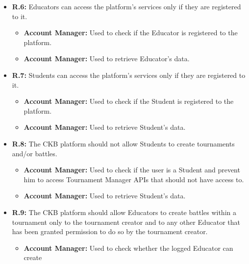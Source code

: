 \documentclass{article}
\begin{document}
{\begin{itemize}
\begin{itemize}
          \begin{itemize}
              \item \textbf{Account Manager:} Used to check if the Educator has already
              registered to the platform.
              \item \textbf{Account Manager:} Used to retrieve Educator's data.
          \end{itemize}
    \item \textbf{R.6:} Educators can access the platform's services only if they are registered to it.
          \begin{itemize}
              \item \textbf{Account Manager:} Used to check if the Educator is registered to
              the platform.
              \item \textbf{Account Manager:} Used to retrieve Educator's data.
          \end{itemize}
    \item \textbf{R.7:} Students can access the platform's services only if they are registered to it.
          \begin{itemize}
            \item \textbf{Account Manager:} Used to check if the Student is registered to
            the platform.
            \item \textbf{Account Manager:} Used to retrieve Student's data.
          \end{itemize}
    \item \textbf{R.8:} The CKB platform should not allow Students to create tournaments and/or battles.
          \begin{itemize}
              \item \textbf{Account Manager:} Used to check if the user is a Student and prevent him
              to access Tournament Manager APIs that should not have access to.
              \item \textbf{Account Manager:} Used to retrieve Student's data.
          \end{itemize}
    \item \textbf{R.9:} The CKB platform should allow Educators to create battles within a tournament only to the tournament
          creator and to any other Educator that has been granted permission to do so by the tournament creator.
          \begin{itemize}
              \item \textbf{Account Manager:} Used to check whether the logged Educator can create

\end{itemize}
\end{itemize}
\end{itemize}}
\end{document}

